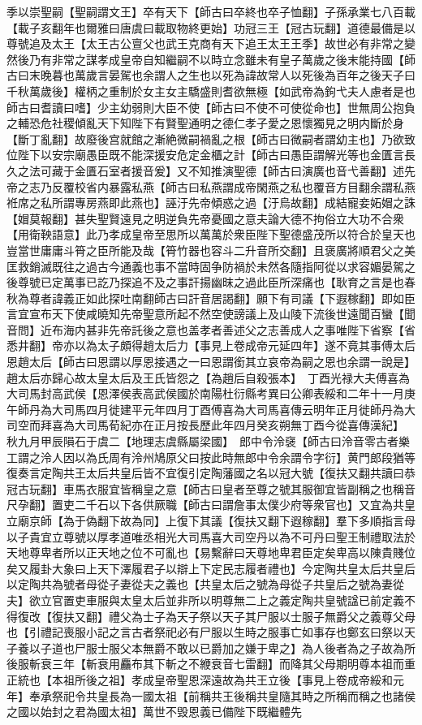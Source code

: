 季以崇聖嗣【聖嗣謂文王】卒有天下【師古曰卒終也卒子恤翻】子孫承業七八百載【載子亥翻年也爾雅曰唐虞曰載取物終更始】功冠三王【冠古玩翻】道德最備是以尊號追及太王【太王古公亶父也武王克商有天下追王太王王季】故世必有非常之變然後乃有非常之謀孝成皇帝自知繼嗣不以時立念雖未有皇子萬歲之後末能持國【師古曰末晚暮也萬歲言晏駕也余謂人之生也以死為諱故常人以死後為百年之後天子曰千秋萬歲後】權柄之重制於女主女主驕盛則耆欲無極【如武帝為鉤弋夫人慮者是也師古曰耆讀曰嗜】少主幼弱則大臣不使【師古曰不使不可使從命也】世無周公抱負之輔恐危社稷傾亂天下知陛下有賢聖通明之德仁孝子愛之恩懷獨見之明内斷於身【斷丁亂翻】故廢後宫就館之漸絶微嗣禍亂之根【師古曰微嗣者謂幼主也】乃欲致位陛下以安宗廟愚臣既不能深援安危定金櫃之計【師古曰愚臣謂解光等也金匱言長久之法可藏于金匱石室者援音爰】又不知推演聖德【師古曰演廣也音弋善翻】述先帝之志乃反覆校省内暴露私燕【師古曰私燕謂成帝閑燕之私也覆音方目翻余謂私燕袵席之私所謂專房燕即此燕也】誣汙先帝傾惑之過【汙烏故翻】成結寵妾妬媢之誅【媢莫報翻】甚失聖賢遠見之明逆負先帝憂國之意夫論大德不拘俗立大功不合衆【用衛鞅語意】此乃孝成皇帝至思所以萬萬於衆臣陛下聖德盛茂所以符合於皇天也豈當世庸庸斗筲之臣所能及哉【筲竹器也容斗二升音所交翻】且褒廣將順君父之美匡救銷滅既往之過古今通義也事不當時固争防禍於未然各隨指阿從以求容媚晏駕之後尊號已定萬事已訖乃探追不及之事訐揚幽昩之過此臣所深痛也【耿育之言是也春秋為尊者諱義正如此探吐南翻師古曰訐音居謁翻】願下有司議【下遐稼翻】即如臣言宜宣布天下使咸曉知先帝聖意所起不然空使謗議上及山陵下流後世遠聞百蠻【聞音問】近布海内甚非先帝託後之意也盖孝者善述父之志善成人之事唯陛下省察【省悉井翻】帝亦以為太子頗得趙太后力【事見上卷成帝元延四年】遂不竟其事傅太后恩趙太后【師古曰恩謂以厚恩接遇之一曰恩謂銜其立哀帝為嗣之恩也余謂一說是】趙太后亦歸心故太皇太后及王氏皆怨之【為趙后自殺張本】　丁酉光禄大夫傅喜為大司馬封高武侯【恩澤侯表高武侯國於南陽杜衍縣考異曰公卿表綏和二年十一月庚午師丹為大司馬四月徙建平元年四月丁酉傅喜為大司馬喜傳云明年正月徙師丹為大司空而拜喜為大司馬荀紀亦在正月按長歷此年四月癸亥朔無丁酉今從喜傳漢紀】　秋九月甲辰隕石于虞二【地理志虞縣屬梁國】　郎中令泠襃【師古曰泠音零古者樂工謂之泠人因以為氏周有泠州鳩原父曰按此時無郎中令余謂令字衍】黄門郎段猶等復奏言定陶共王太后共皇后皆不宜復引定陶藩國之名以冠大號【復扶又翻共讀曰恭冠古玩翻】車馬衣服宜皆稱皇之意【師古曰皇者至尊之號其服御宜皆副稱之也稱音尺孕翻】置吏二千石以下各供厥職【師古曰謂詹事太僕少府等衆官也】又宜為共皇立廟京師【為于偽翻下故為同】上復下其議【復扶又翻下遐稼翻】羣下多順指言母以子貴宜立尊號以厚孝道唯丞相光大司馬喜大司空丹以為不可丹曰聖王制禮取法於天地尊卑者所以正天地之位不可亂也【易繫辭曰天尊地卑君臣定矣卑高以陳貴賤位矣又履卦大象曰上天下澤履君子以辯上下定民志履者禮也】今定陶共皇太后共皇后以定陶共為號者母從子妻從夫之義也【共皇太后之號為母從子共皇后之號為妻從夫】欲立官置吏車服與太皇太后並非所以明尊無二上之義定陶共皇號諡已前定義不得復改【復扶又翻】禮父為士子為天子祭以天子其尸服以士服子無爵父之義尊父母也【引禮記喪服小記之言古者祭祀必有尸服以生時之服事亡如事存也鄭玄曰祭以天子養以子道也尸服士服父本無爵不敢以已爵加之嫌于卑之】為人後者為之子故為所後服斬衰三年【斬衰用麤布其下斬之不緶衰音七雷翻】而降其父母期明尊本祖而重正統也【本祖所後之祖】孝成皇帝聖恩深遠故為共王立後【事見上卷成帝綏和元年】奉承祭祀令共皇長為一國太祖【前稱共王後稱共皇隨其時之所稱而稱之也諸侯之國以始封之君為國太祖】萬世不毁恩義已備陛下既繼體先